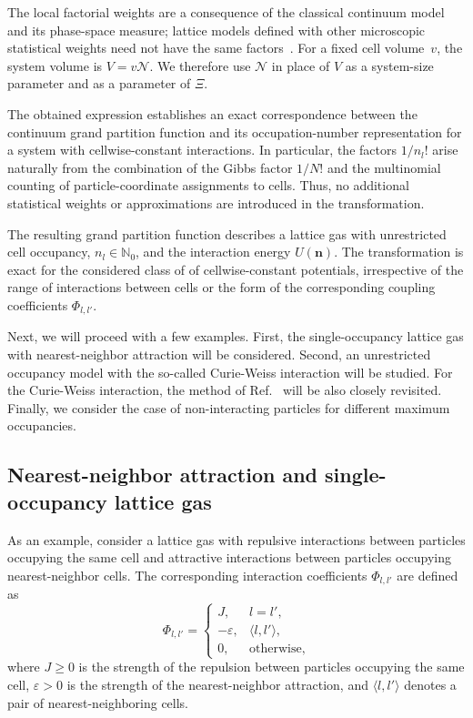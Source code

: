 \documentclass[12pt]{article}
\begin{document}
	The local factorial weights are a consequence of the classical continuum model and its phase-space measure; lattice models defined with other microscopic statistical weights need not have the same factors~\cite{FL18}.
	For a fixed cell volume~$v$, the system volume is $V=v\mathcal{N}$. We therefore use $\mathcal{N}$ in place of $V$ as a system-size parameter and as a parameter of $\Xi$.
	
	The obtained expression establishes an exact correspondence between the continuum grand partition function and its occupation-number representation for a system with cellwise-constant interactions. In particular, the factors $1/n_l!$ arise naturally from the combination of the Gibbs factor $1/N!$ and the multinomial counting of particle-coordinate assignments to cells. Thus, no additional statistical weights or approximations are introduced in the transformation.
	
	The resulting grand partition function describes a lattice gas with unrestricted cell occupancy, $n_l \in \mathbb{N}_0$, and the interaction energy $U(\mathbf{n})$. The transformation is exact for the considered class of of cellwise-constant potentials, irrespective of the range of interactions between cells or the form of the corresponding coupling coefficients $\Phi_{l, {l'}}$.
	
	Next, we will proceed with a few examples. First, the single-occupancy lattice gas with nearest-neighbor attraction will be considered. Second, an unrestricted occupancy model with the so-called Curie-Weiss interaction will be studied. For the Curie-Weiss interaction, the method of Ref.~\cite{KKD20} will be also closely revisited. Finally, we consider the case of non-interacting particles for different maximum occupancies.
	
	\subsection{Nearest-neighbor attraction and single-occupancy lattice gas}
	As an example, consider a lattice gas with repulsive interactions between particles occupying the same cell and attractive interactions between particles occupying nearest-neighbor cells. The corresponding interaction coefficients $\Phi_{l, {l'}}$ are defined as
	\begin{equation}
		\Phi_{l, {l'}} = 
		\begin{cases}
			J, & l = l',\\
			-\varepsilon, & \langle l, l' \rangle, \\
			0, & \text{otherwise},
		\end{cases}
	\end{equation}
	where $J \geq 0$ is the strength of the repulsion between particles occupying the same cell, $\varepsilon > 0$ is the strength of the nearest-neighbor attraction, and $\langle l, l' \rangle$ denotes a pair of nearest-neighboring cells.
	
\end{document}
